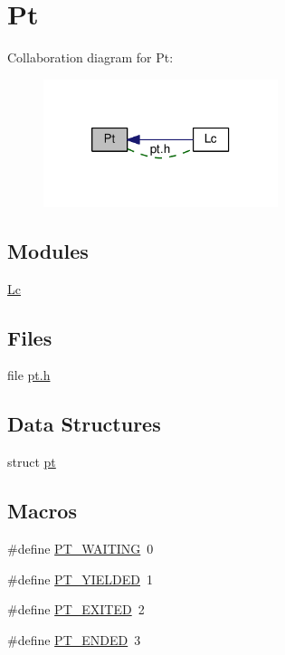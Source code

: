 \hypertarget{group__pt}{\section{Pt}
\label{group__pt}
}
Collaboration diagram for Pt\+:\nopagebreak
\begin{figure}[H]
\begin{center}
\leavevmode
\includegraphics[width=194pt]{group__pt}
\end{center}
\end{figure}
\subsection*{Modules}
\begin{DoxyCompactItemize}
\item 
\hyperlink{group__lc}{Lc}
\end{DoxyCompactItemize}
\subsection*{Files}
\begin{DoxyCompactItemize}
\item 
file \hyperlink{pt_8h}{pt.\+h}
\end{DoxyCompactItemize}
\subsection*{Data Structures}
\begin{DoxyCompactItemize}
\item 
struct \hyperlink{structpt}{pt}
\end{DoxyCompactItemize}
\subsection*{Macros}
\begin{DoxyCompactItemize}
\item 
\#define \hyperlink{group__pt_ga7b5319b5b65761a845fcd1500fde4cdc}{P\+T\+\_\+\+W\+A\+I\+T\+I\+N\+G}~0
\item 
\#define \hyperlink{group__pt_gae469332907e0617d72d5e2dd4297119d}{P\+T\+\_\+\+Y\+I\+E\+L\+D\+E\+D}~1
\item 
\#define \hyperlink{group__pt_gacfae9053e5c107a1aed6b228c917d2ea}{P\+T\+\_\+\+E\+X\+I\+T\+E\+D}~2
\item 
\#define \hyperlink{group__pt_ga9ff1e8936a8a26bff54c05f8a989b93b}{P\+T\+\_\+\+E\+N\+D\+E\+D}~3
\end{DoxyCompactItemize}
